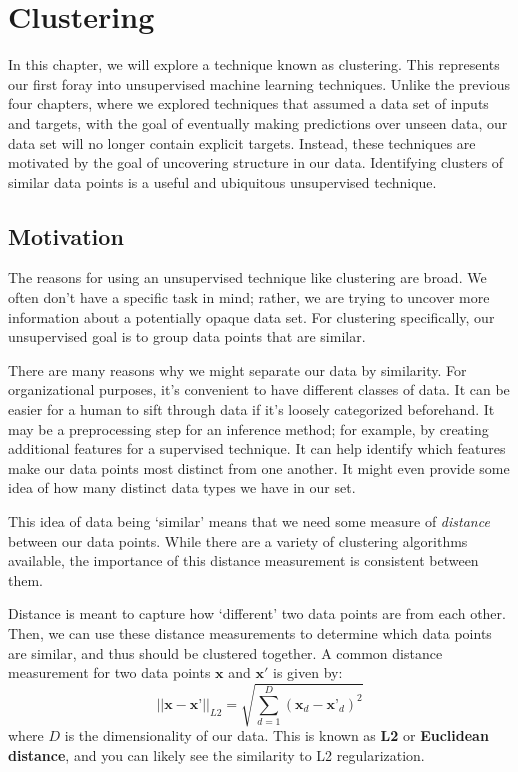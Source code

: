 \chapter{Clustering}
In this chapter, we will explore a technique known as clustering. This represents our first foray into unsupervised machine learning techniques. Unlike the previous four chapters, where we explored techniques that assumed a data set of inputs and targets, with the goal of eventually making predictions over unseen data, our data set will no longer contain explicit targets. Instead, these techniques are motivated by the goal of uncovering structure in our data. Identifying clusters of similar data points is a useful and ubiquitous unsupervised technique.

\section{Motivation}
The reasons for using an unsupervised technique like clustering are broad. We often don't have a specific task in mind; rather, we are trying to uncover more information about a potentially opaque data set. For clustering specifically, our unsupervised goal is to group data points that are similar.

There are many reasons why we might separate our data by similarity. For organizational purposes, it's convenient to have different classes of data. It can be easier for a human to sift through data if it's loosely categorized beforehand. It may be a preprocessing step for an inference method; for example, by creating additional features for a supervised technique. It can help identify which features make our data points most distinct from one another. It might even provide some idea of how many distinct data types we have in our set. 

This idea of data being `similar' means that we need some measure of \textit{distance} between our data points. While there are a variety of clustering algorithms available, the importance of this distance measurement is consistent between them.

Distance is meant to capture how `different' two data points are from each other. Then, we can use these distance measurements to determine which data points are similar, and thus should be clustered together. A common distance measurement for two data points $\textbf{x}$ and $\textbf{x}'$ is given by:
\begin{equation} \label{l2-distance}
	|| \textbf{x} - \textbf{x'} ||_{L2} = \sqrt{\sum_{d=1}^{D} (\textbf{x}_{d} - \textbf{x'}_{d})^{2}}
\end{equation}
where $D$ is the dimensionality of our data. This is known as \textbf{L2} or \textbf{Euclidean distance}, and you can likely see the similarity to L2 regularization.

